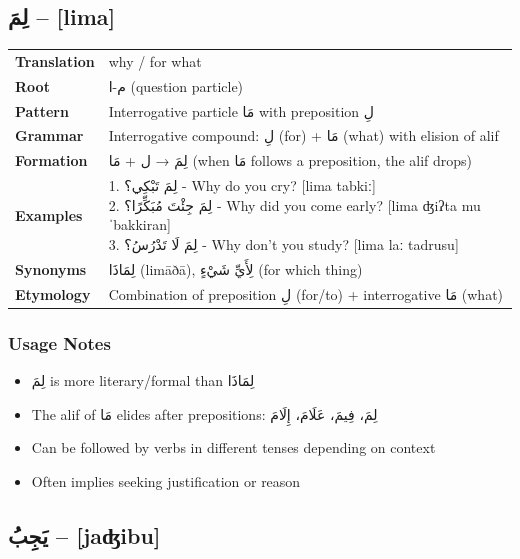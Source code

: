 \documentclass[letterpaper,12pt]{article}
\begin{document}
\subsection{\textarabic{لِمَ} – [lima]}
\begin{tabular}{p{3cm}p{10cm}}
\toprule
\textbf{Translation} & why / for what \\
\textbf{Root} & \textarabic{م-ا} (question particle) \\
\textbf{Pattern} & Interrogative particle \textarabic{مَا} with preposition \textarabic{لِ} \\
\textbf{Grammar} & Interrogative compound: \textarabic{لِ} (for) + \textarabic{مَا} (what) with elision of alif \\
\midrule
\textbf{Formation} & \textarabic{لِمَ} →  \textarabic{ل} + \textarabic{مَا} (when \textarabic{مَا} follows a preposition, the alif drops) \\
\midrule
\textbf{Examples} & \makecell[l]{\parbox{9.5cm}{
1. \textarabic{لِمَ تَبْكِي؟} - Why do you cry? [lima tabkiː]\\
2. \textarabic{لِمَ جِئْتَ مُبَكِّرًا؟} - Why did you come early? [lima ʤiʔta muˈbakkiran]\\
3. \textarabic{لِمَ لَا تَدْرُسُ؟} - Why don't you study? [lima laː tadrusu]
}} \\
\midrule
\textbf{Synonyms} & \textarabic{لِمَاذَا} (limāðā), \textarabic{لِأَيِّ شَيْءٍ} (for which thing) \\
\textbf{Etymology} & Combination of preposition \textarabic{لِ} (for/to) + interrogative \textarabic{مَا} (what) \\
\bottomrule
\end{tabular}

\subsubsection*{Usage Notes}
\begin{itemize}
  \item \textarabic{لِمَ} is more literary/formal than \textarabic{لِمَاذَا}
  \item The alif of \textarabic{مَا} elides after prepositions: \textarabic{لِمَ، فِيمَ، عَلَامَ، إِلَامَ}
  \item Can be followed by verbs in different tenses depending on context
  \item Often implies seeking justification or reason
\end{itemize}

\subsection{\textarabic{يَجِبُ} – [jaʤibu]}
\end{document}

